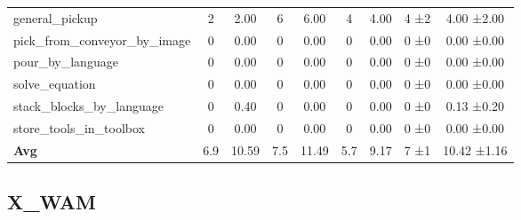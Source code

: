 \begin{table}[H]
{\begin{tabular}{l|c|c|c|c|c|c|c|c}
general\_pickup & 2 & 2.00 & 6 & 6.00 & 4 & 4.00 & 4 ±2 & 4.00 ±2.00 \\
pick\_from\_conveyor\_by\_image & 0 & 0.00 & 0 & 0.00 & 0 & 0.00 & 0 ±0 & 0.00 ±0.00 \\
pour\_by\_language & 0 & 0.00 & 0 & 0.00 & 0 & 0.00 & 0 ±0 & 0.00 ±0.00 \\
solve\_equation & 0 & 0.00 & 0 & 0.00 & 0 & 0.00 & 0 ±0 & 0.00 ±0.00 \\
stack\_blocks\_by\_language & 0 & 0.40 & 0 & 0.00 & 0 & 0.00 & 0 ±0 & 0.13 ±0.20 \\
store\_tools\_in\_toolbox & 0 & 0.00 & 0 & 0.00 & 0 & 0.00 & 0 ±0 & 0.00 ±0.00 \\
\hline
\textbf{Avg} & 6.9 & 10.59 & 7.5 & 11.49 & 5.7 & 9.17 & 7 ±1 & 10.42 ±1.16 \\
\hline
\end{tabular}
}
\end{table}
\subsection{X\_WAM}
\label{part:x_wam}

